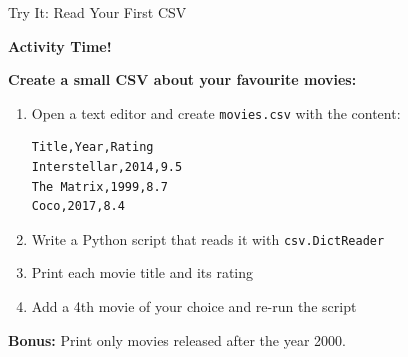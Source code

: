 \documentclass{csbeamer}
\begin{document}
\begin{frame}[fragile]{Try It: Read Your First CSV}
    \begin{center}
        \Large \textbf{Activity Time!}
    \end{center}

    \vspace{1em}

    \textbf{Create a small CSV about your favourite movies:}
    \begin{enumerate}
        \item Open a text editor and create \texttt{movies.csv} with the content:
        \begin{lstlisting}[language={},frame=single,numbers=none]
Title,Year,Rating
Interstellar,2014,9.5
The Matrix,1999,8.7
Coco,2017,8.4
        \end{lstlisting}
        \item Write a Python script that reads it with \texttt{csv.DictReader}
        \item Print each movie title and its rating
        \item Add a 4th movie of your choice and re-run the script
    \end{enumerate}

    \vspace{0.5em}

    \textbf{Bonus:} Print only movies released after the year 2000.
\end{frame}
\end{document}
